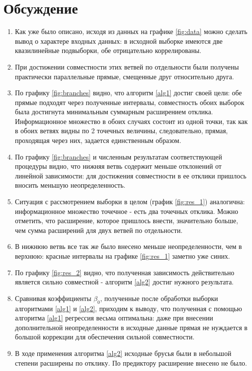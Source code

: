 \documentclass[a4paper]{article}
\begin{document}
\section{Обсуждение}
\begin{enumerate}
    \item Как уже было описано, исходя из данных на графике \ref{fig:data} можно сделать вывод о характере входных данных: в исходной выборке имеются две квазилинейные подвыборки, обе отрицательно коррелированы.
    \item При достижении совместности этих ветвей по отдельности были получены практически параллельные прямые, смещенные друг относительно друга. 
    \item По графику \ref{fig:branches} видно, что алгоритм \ref{alg1} достиг своей цели: обе прямые подходят через полученные интервалы, совместность обоих выборок была достигнута минимальным суммарным расширением отклика. Информационное множество в обоих случаях состоит из одной точки, так как в обоих ветвях видны по 2 точечных величины, следовательно, прямая, проходящая через них, задается единственным образом. 
    \item По графику \ref{fig:branches} и численным результатам соответствующей процедуры видно, что нижняя ветвь содержит меньше отклонений от линейной зависимости: для достижения совместности в ее отклики пришлось вносить меньшую неопределенность.
    \item Ситуация с рассмотрением выборки в целом (график \ref{fig:res_1}) аналогична: информационное множество точечное - есть два точечных отклика. Можно отметить, что расширение, которое пришлось внести, значительно больше, чем сумма расширений для двух ветвей по отдельности. 
    \item В нижнюю ветвь все так же было внесено меньше неопределенности, чем в верхнюю: красные интервалы на графике \ref{fig:res_1} заметно уже синих.
    \item По графику \ref{fig:res_2} видно, что полученная зависимость действительно является сильно совместной - алгоритм \ref{alg2} достиг нужного результата. 
    \item Сравнивая коэффициенты $\beta_0$, полученные после обработки выборки алгоритмами \ref{alg1} и \ref{alg2}, приходим к выводу, что полученная с помощью алгоритма \ref{alg1} регрессия весьма оптимальна: даже при внесении дополнительной неопределенности в исходные данные прямая не нуждается в большой коррекции для обеспечения сильной совместности. 
    \item В ходе применения алгоритма \ref{alg2} исходные брусья были в небольшой степени расширены по отклику. По предиктору расширение внесено не было.

\end{enumerate}
\end{document}
